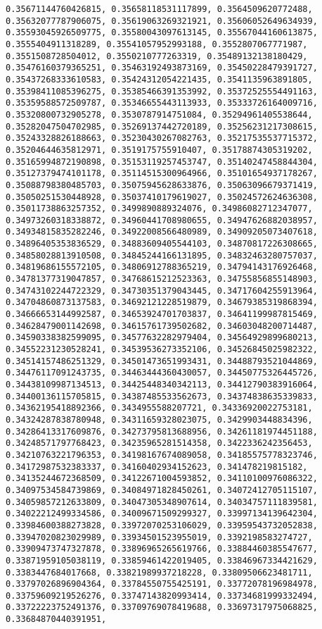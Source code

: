 \documentclass[11pt]{article}
\begin{document}
\begin{Verbatim}[commandchars=\\\{\}]
0.35671144760426815, 0.35658118531117899, 0.3564509620772488, 0.35632077787906075, 0.35619063269321921, 0.35606052649634939, 0.35593045926509775, 0.35580043097613145, 0.35567044160613875, 0.3555404911318289, 0.35541057952993188, 0.3552807067771987, 0.3551508728504012, 0.3550210777263319, 0.35489132138180429, 0.35476160379365251, 0.35463192493873169, 0.35450228479391727, 0.35437268333610583, 0.35424312054221435, 0.3541135963891805, 0.35398411085396275, 0.35385466391353992, 0.35372525554491163, 0.35359588572509787, 0.35346655443113933, 0.35333726164009716, 0.35320800732905278, 0.3530787914751084, 0.35294961405538644, 0.35282047504702985, 0.35269137442720189, 0.35256231217308615, 0.35243328826188663, 0.35230430267082763, 0.35217535537715372, 0.35204644635812971, 0.3519175755910407, 0.35178874305319202, 0.35165994872190898, 0.35153119257453747, 0.35140247458844304, 0.35127379474101178, 0.35114515300964966, 0.35101654937178267, 0.35088798380485703, 0.35075945628633876, 0.35063096679371419, 0.35050251530448928, 0.35037410179619027, 0.35024572624636308, 0.35011738863257352, 0.3499890889324076, 0.34986082712347077, 0.34973260318338872, 0.34960441708980655, 0.34947626882038957, 0.34934815835282246, 0.34922008566480989, 0.34909205073407618, 0.34896405353836529, 0.34883609405544103, 0.34870817226308665, 0.34858028813910508, 0.34845244166131895, 0.34832463280757037, 0.34819686155572105, 0.34806912788365219, 0.34794143176926468, 0.34781377319047857, 0.34768615212523363, 0.34755856855148903, 0.34743102244722329, 0.34730351379043445, 0.34717604255913964, 0.34704860873137583, 0.34692121228519879, 0.34679385319868394, 0.34666653144992587, 0.34653924701703837, 0.34641199987815469, 0.34628479001142698, 0.34615761739502682, 0.34603048200714487, 0.34590338382599095, 0.34577632282979404, 0.34564929899680213, 0.34552231230528241, 0.34539536273352106, 0.34526845025982322, 0.34514157486251329, 0.34501473651993431, 0.34488793521044869, 0.34476117091243735, 0.34463444360430057, 0.34450775326445726, 0.34438109987134513, 0.34425448340342113, 0.34412790383916064, 0.34400136115705815, 0.34387485533562673, 0.34374838635339833, 0.34362195418892366, 0.3434955588207721, 0.34336920022753181, 0.34324287838780948, 0.34311659328023075, 0.3429903448834396, 0.34286413317609876, 0.34273795813688956, 0.34261181974451188, 0.34248571797768423, 0.34235965281514358, 0.3422336242356453, 0.34210763221796353, 0.34198167674089058, 0.34185575778323746, 0.34172987532383337, 0.34160402934152623, 0.341478219815182, 0.34135244672368509, 0.34122671004593852, 0.34110100976086322, 0.34097534584739869, 0.34084971828450261, 0.34072412705115107, 0.34059857212633809, 0.34047305348907614, 0.34034757111839581, 0.34022212499334586, 0.34009671509299327, 0.33997134139642304, 0.33984600388273828, 0.33972070253106029, 0.33959543732052838, 0.33947020823029989, 0.33934501523955019, 0.3392198583274727, 0.33909473747327878, 0.33896965265619766, 0.33884460385547677, 0.33871959105038119, 0.33859461422019405, 0.33846967334421629, 0.3383447684017668, 0.33821989937218228, 0.33809506623481711, 0.33797026896904364, 0.33784550755425191, 0.33772078196984978, 0.33759609219526276, 0.33747143820993414, 0.33734681999332494, 0.33722223752491376, 0.33709769078419688, 0.33697317975068825, 0.33684870440391951, 
\end{Verbatim}
\end{document}
